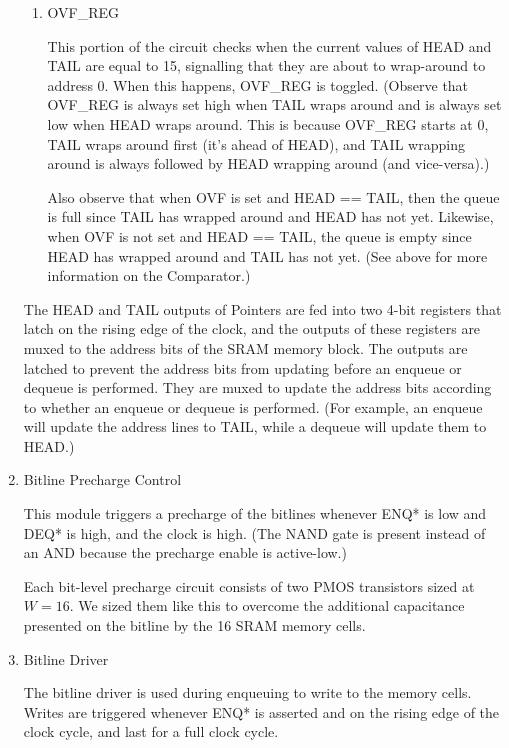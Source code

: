 \documentclass[12pt]{report}
\begin{document}
\begin{enumerate}
\begin{enumerate}
    \item OVF_REG

    This portion of the circuit checks when the current values of HEAD and TAIL are equal to 15, signalling that they are about to wrap-around to address 0. When this happens, OVF_REG is toggled. (Observe that OVF_REG is always set high when TAIL wraps around and is always set low when HEAD wraps around. This is because OVF_REG starts at 0, TAIL wraps around first (it's ahead of HEAD), and TAIL wrapping around is always followed by HEAD wrapping around (and vice-versa).)

    Also observe that when OVF is set and HEAD == TAIL, then the queue is full since TAIL has wrapped around and HEAD has not yet. Likewise, when OVF is not set and HEAD == TAIL, the queue is empty since HEAD has wrapped around and TAIL has not yet. (See above for more information on the Comparator.)
  \end{enumerate}

  The HEAD and TAIL outputs of Pointers are fed into two 4-bit registers that latch on the rising edge of the clock, and the outputs of these registers are muxed to the address bits of the SRAM memory block. The outputs are latched to prevent the address bits from updating before an enqueue or dequeue is performed. They are muxed to update the address bits according to whether an enqueue or dequeue is performed. (For example, an enqueue will update the address lines to TAIL, while a dequeue will update them to HEAD.)

  \item Bitline Precharge Control

  This module triggers a precharge of the bitlines whenever ENQ* is low and DEQ* is high, and the clock is high. (The NAND gate is present instead of an AND because the precharge enable is active-low.)

  Each bit-level precharge circuit consists of two PMOS transistors sized at $W = 16$. We sized them like this to overcome the additional capacitance presented on the bitline by the 16 SRAM memory cells.

  \item Bitline Driver

  The bitline driver is used during enqueuing to write to the memory cells. Writes are triggered whenever ENQ* is asserted and on the rising edge of the clock cycle, and last for a full clock cycle.
\end{enumerate}
\end{document}

